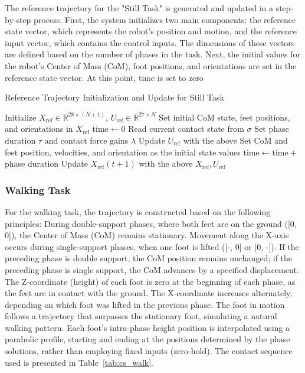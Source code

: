 \documentclass[main.tex]{subfiles}
\begin{document}
The reference trajectory for the "Still Task" is generated and updated in a step-by-step process. First, the system initializes two main components: the reference state vector, which represents the robot's position and motion, and the reference input vector, which contains the control inputs. The dimensions of these vectors are defined based on the number of phases in the task.
Next, the initial values for the robot's Center of Mass (CoM), foot positions, and orientations are set in the reference state vector. At this point, time is set to zero
\begin{algorithm}[H]
\caption{Reference Trajectory Initialization and Update for Still Task}
\begin{algorithmic}[1]
\State Initialize $X_{\text{ref}} \in \mathbb{R}^{28 \times (N+1)}$, $U_{\text{ref}} \in \mathbb{R}^{27 \times N}$
\State Set initial CoM state, feet positions, and orientations in $X_{\text{ref}}$
\State $\text{time} \gets 0$
    \State Read current contact state from $\sigma$
    \State Set phase duration $\tau$ and contact force gains $\lambda$
    \State Update $U_{\text{ref}}$ with the above
    \State Set CoM and feet position, velocities, and orientation as the initial state values
    \State $\text{time} \gets \text{time} +$ phase duration
    \State Update $X_{\text{ref}}(t+1)$ with the above
\EndFor
\State \Return $X_{\text{ref}}, U_{\text{ref}}$
\end{algorithmic}
\end{algorithm}

\subsubsection*{Walking Task}

For the walking task, the trajectory is constructed based on the following principles:
During double-support phases, where both feet are on the ground ([0, 0]), the Center of Mass (CoM) remains stationary. Movement along the X-axis occurs during single-support phases, when one foot is lifted ([-, 0] or [0, -]). If the preceding phase is double support, the CoM position remains unchanged; if the preceding phase is single support, the CoM advances by a specified displacement.
The Z-coordinate (height) of each foot is zero at the beginning of each phase, as the feet are in contact with the ground. The X-coordinate increases alternately, depending on which foot was lifted in the previous phase. The foot in motion follows a trajectory that surpasses the stationary foot, simulating a natural walking pattern.
Each foot's intra-phase height position is interpolated using a parabolic profile, starting and ending at the positions determined by the phase solutions, rather than employing fixed inputs (zero-hold).
The contact sequence used is presented in Table~\ref{tab:cs_walk}.
\end{document}
